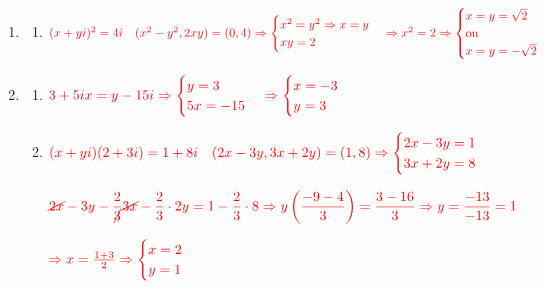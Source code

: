 \documentclass[12pt, openright, a4paper, twoside, english, brazil]{article}
\newenvironment{qmitem}{
  \color{black}
\item
\begin{enumerate}[\bfseries a)]}{
\end{enumerate}\vspace{10pt}}
\begin{document}
\begin{enumerate}[\bfseries 1.]
\begin{qmitem}
    $\displaystyle\color{red} \cancel{3x} - 4y -
    \frac{3}{\cancel{4}}\cancel{4x} -
    \frac{3}{4}
    \cdot 3y = 7 - \frac{3}{4} \cdot 26 \Rightarrow -4y - \frac{9}{4}y =
    7 - \frac{3 \cdot 26}{4} \Rightarrow -y\left(\frac{4^2+3^2}{4}\right)
    = \frac{28-78}{4}$

    $\displaystyle\color{red} y = \frac{50}{25} = 2$

    $\displaystyle\color{red}\Rightarrow x = \frac{7 + 4 \cdot 2}{3}
    = \frac{15}{3} =
    5 \Rightarrow
    \begin{cases} x=5 \\ y=2
    \end{cases}$

  \item $\color{red} (x+yi)^2 = 4i \quad (x^2-y^2, 2xy) = (0,4) \Rightarrow
    \begin{cases} x^2=y^2 \Rightarrow x=y \\ xy=2
    \end{cases} \Rightarrow x^2=2 \Rightarrow
    \begin{cases} x=y=\sqrt{2} \\ \text{ou} \\ x=y=-\sqrt{2}
    \end{cases}$
  \end{qmitem}

  \begin{qmitem} %
  \item $\color{red} 3+5ix = y-15i \Rightarrow
    \begin{cases} y=3 \\ 5x=-15
    \end{cases} \Rightarrow
    \begin{cases} x=-3 \\ y=3
    \end{cases}$

  \item $\color{red} (x+yi)(2+3i) = 1+8i \quad (2x-3y, 3x+2y) = (1,8)
    \Rightarrow
    \begin{cases} 2x-3y=1 \\ 3x+2y=8
    \end{cases}$

    $\color{red}\displaystyle \cancel{2x} - 3y -
    \frac{2}{\cancel{3}}\cancel{3x} -
    \frac{2}{3} \cdot 2y = 1 - \frac{2}{3} \cdot 8 \Rightarrow
    y\left(\frac{-9-4}{3}\right) = \frac{3-16}{3} \Rightarrow y =
    \frac{-13}{-13} = 1$

    $\color{red} \Rightarrow x = \frac{1+3}{2} \Rightarrow
    \begin{cases} x=2 \\ y=1
    \end{cases}$


\end{qmitem}
\end{enumerate}
\end{document}
